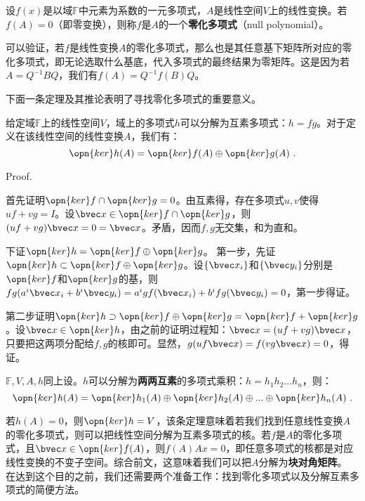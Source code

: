 

\begin{issues}
\issueDraft 
\end{issues}

\begin{definition}{}
设$f(x)$是以域$\mathbb F$中元素为系数的一元多项式，$A$是线性空间$V$上的线性变换。若$f(A)=0$（即零变换），则称$f$是$A$的一个\textbf{零化多项式}（null polynomial）。
\end{definition}
可以验证，若$f$是线性变换$A$的零化多项式，那么也是其任意基下矩阵所对应的零化多项式，即无论选取什么基底，代入多项式的最终结果为零矩阵。这是因为若$A=Q^{-1}BQ$，我们有$f(A)=Q^{-1}f(B)Q$。


下面一条定理及其推论表明了寻找零化多项式的重要意义。
\begin{theorem}{}
给定域$\mathbb F$上的线性空间$V$，域上的多项式$h$可以分解为互素多项式：$h=fg$。对于定义在该线性空间的线性变换$A$，我们有：
\begin{equation}
\opn{ker}h(A)=\opn{ker}f(A)\oplus\opn{ker}g(A)~.
\end{equation}
\end{theorem}
Proof.

首先证明$\opn{ker}f\cap \opn{ker}g=0$。由互素得，存在多项式$u,v$使得$uf+vg=I$。设$\bvec x\in \opn{ker}f\cap \opn{ker}g$，则$(uf+vg)\bvec x=0=\bvec x$。矛盾，因而$f,g$无交集，和为直和。

下证$\opn{ker}h=\opn{ker}f\oplus\opn{ker}g$。
第一步，先证$\opn{ker}h\subset\opn{ker}f\oplus\opn{ker}g$。设$\{\bvec x_i\}$和$\{\bvec y_i\}$分别是$\opn{ker}f$和$\opn{ker}g$的基，则$fg(a^i\bvec x_i+b^i \bvec y_i)=a^igf(\bvec x_i)+b^ifg(\bvec y_i)=0$，第一步得证。

第二步证明$\opn{ker}h\supset\opn{ker}f\oplus\opn{ker}g=\opn{ker}f+\opn{ker}g$。设$\bvec x\in \opn{ker}h$，由之前的证明过程知：$\bvec x=(uf+vg)\bvec x$，只要把这两项分配给$f,g$的核即可。显然，$g(uf\bvec x)=f(vg\bvec x) =0$，得证。

\begin{corollary}{}\label{cor_nullpl_1}
$\mathbb F,V,A,h$同上设。$h$可以分解为\textbf{两两互素}的多项式乘积：$h=h_1h_2...h_n$，则：
\begin{equation}
\opn{ker}h(A)=\opn{ker}h_1(A)\oplus\opn{ker}h_2(A)\oplus...\oplus\opn{ker}h_n(A)~.
\end{equation}
\end{corollary}

若$h(A)=0$，则$\opn{ker} h=V$，该条定理意味着若我们找到任意线性变换$A$的零化多项式，则可以把线性空间分解为互素多项式的核。若$f$是$A$的零化多项式，且$\bvec x\in \opn{ker}f(A)$，则$f(A)A x=0$，即任意多项式的核都是对应线性变换的不变子空间。综合前文，这意味着我们可以把$A$分解为\textbf{块对角矩阵}。
在达到这个目的之前，我们还需要两个准备工作：找到零化多项式以及分解互素多项式的简便方法。


